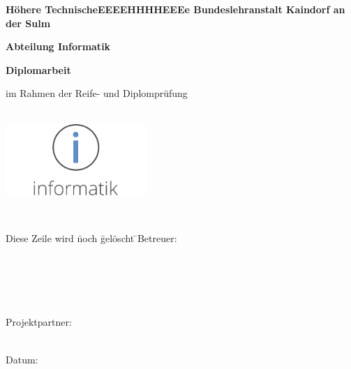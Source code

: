 \begin{titlepage}
	
	{\textbf {Höhere TechnischeEEEEHHHHEEEe Bundeslehranstalt Kaindorf an der Sulm}\par\vspace{0.3cm}}
	{\textbf {Abteilung Informatik}\par	\vspace{0.7cm}}
	\Large{\textbf{Diplomarbeit}}\par\vspace{0.2cm}
	\small im Rahmen der Reife- und Diplomprüfung\par
	\vspace{1.5cm}
	\Huge\textbf{\daTitle}\\
	\vspace{1cm}
	\includegraphics[width=0.4\textwidth]{images/inf_farbe_2.pdf}\\
	\vspace{1cm}
	\normalsize \daAuthorOne \par
	\normalsize \daAuthorTwo \par
	\normalsize \daAuthorThree \par
	\vspace{0,5cm}
	\daGrade\\ \daYear
	\vfill
	\begin{flushleft}
	\begin{tabbing}
	Diese Zeile wird \= noch \= gelöscht \=  \kill\vspace{0.2cm}Betreuer:\> \daSupervisorOne\par 
	\\\vspace{0.2cm}\> \daSupervisorTwo \par 
	\\\vspace{0.2cm}\> \daSupervisorThree \par 
	\\\vspace{0.2cm}Projektpartner:\> \daPartner \par
	\\Datum:\> \daDocDate
	\end{tabbing}
	\end{flushleft}
\end{titlepage}